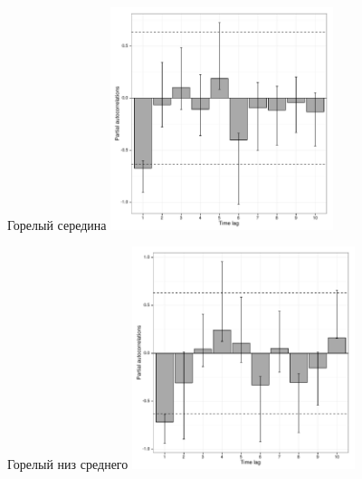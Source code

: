 \documentclass[12pt, a4paper]{disser}
\begin{document}
\begin{figure}[ht]
	\begin{minipage}[b]{.46\linewidth}
	\begin{center}
	{\tiny Горелый середина}
	\includegraphics[width=65mm]{../White_Sea/dynamic_N_N1/boot_PRCF_Goreliy_middle_.pdf}
	\end{center}
	\end{minipage}
%
	\hfil %
%
	\begin{minipage}[b]{.46\linewidth}
	\begin{center}	
	{\tiny Горелый низ среднего}
	\includegraphics[width=65mm]{../White_Sea/dynamic_N_N1/boot_PRCF_Goreliy_midlow_.pdf}
	\end{center}
	\end{minipage}



\end{figure}
\end{document}
